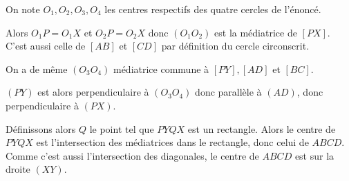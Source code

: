 On note $O_1,O_2,O_3,O_4$ les centres respectifs des quatre cercles de l'énoncé.

Alors $O_1P=O_1X$ et $O_2P=O_2X$ donc $(O_1O_2)$ est la médiatrice de $[PX]$. C'est aussi celle de $[AB]$ et $[CD]$ par définition du cercle circonscrit.

On a de même $(O_3O_4)$ médiatrice commune à $[PY],[AD]$ et $[BC]$.

$(PY)$ est alors perpendiculaire à $(O_3O_4)$ donc parallèle à $(AD)$, donc perpendiculaire à $(PX)$. 

Définissons alors $Q$ le point tel que $PYQX$ est un rectangle. Alors le centre de $PYQX$ est l'intersection des médiatrices dans le rectangle, donc celui de $ABCD$. Comme c'est aussi l'intersection des diagonales, le centre de $ABCD$ est sur la droite $(XY)$.